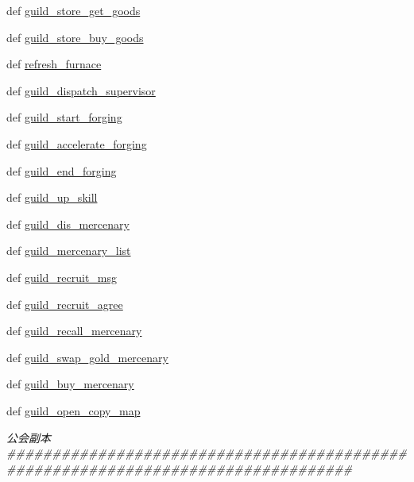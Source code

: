 \begin{DoxyCompactItemize}
\item 
def \hyperlink{namespaceapi_1_1guild_a227a11c7f6a49c87f9d52a0af49cbaca}{guild\-\_\-store\-\_\-get\-\_\-goods}
\item 
def \hyperlink{namespaceapi_1_1guild_a38895a214c500c5accd3a76f730d41e0}{guild\-\_\-store\-\_\-buy\-\_\-goods}
\item 
def \hyperlink{namespaceapi_1_1guild_a25dc4917999def6db8cc584fa52e6fe2}{refresh\-\_\-furnace}
\item 
def \hyperlink{namespaceapi_1_1guild_a560c52532a27a8c92385f7498ce35e5b}{guild\-\_\-dispatch\-\_\-supervisor}
\item 
def \hyperlink{namespaceapi_1_1guild_a2d9be13c36ae95dbd25f2a9c951d8e5e}{guild\-\_\-start\-\_\-forging}
\item 
def \hyperlink{namespaceapi_1_1guild_a19f0ff73ce7f4258800b8f05d3af9987}{guild\-\_\-accelerate\-\_\-forging}
\item 
def \hyperlink{namespaceapi_1_1guild_ace50d1df707c23d282d35d55a245ccc8}{guild\-\_\-end\-\_\-forging}
\item 
def \hyperlink{namespaceapi_1_1guild_ae5279af67a0a6070b24c5e24127dccf3}{guild\-\_\-up\-\_\-skill}
\item 
def \hyperlink{namespaceapi_1_1guild_a16b0677a98a5d40e9651e68ba93c4833}{guild\-\_\-dis\-\_\-mercenary}
\item 
def \hyperlink{namespaceapi_1_1guild_a33c6d6d95500c7c7b52473092f987946}{guild\-\_\-mercenary\-\_\-list}
\item 
def \hyperlink{namespaceapi_1_1guild_a2c07a7f181d24e8334ade0a0089c2ac9}{guild\-\_\-recruit\-\_\-msg}
\item 
def \hyperlink{namespaceapi_1_1guild_aa8a1dbc0521c904c81070e90fc77a908}{guild\-\_\-recruit\-\_\-agree}
\item 
def \hyperlink{namespaceapi_1_1guild_a8094232f0c6db608b7b01faab608ce09}{guild\-\_\-recall\-\_\-mercenary}
\item 
def \hyperlink{namespaceapi_1_1guild_ac6597ca18cd24608118000d02b9aa7e0}{guild\-\_\-swap\-\_\-gold\-\_\-mercenary}
\item 
def \hyperlink{namespaceapi_1_1guild_aff4f6c0305fb3e3d7a05fb70d1267e60}{guild\-\_\-buy\-\_\-mercenary}
\item 
def \hyperlink{namespaceapi_1_1guild_ae7e28463bc82e2976d60a347f88d6e2a}{guild\-\_\-open\-\_\-copy\-\_\-map}
\begin{DoxyCompactList}\small\item\em 公会副本\#\#\#\#\#\#\#\#\#\#\#\#\#\#\#\#\#\#\#\#\#\#\#\#\#\#\#\#\#\#\#\#\#\#\#\#\#\#\#\#\#\#\#\#\#\#\#\#\#\#\#\#\#\#\#\#\#\#\#\#\#\#\#\#\#\#\#\#\#\#\#\#\#\#\#\#\#\#\#\#\#\# \end{DoxyCompactList}\item 

\end{DoxyCompactItemize}
